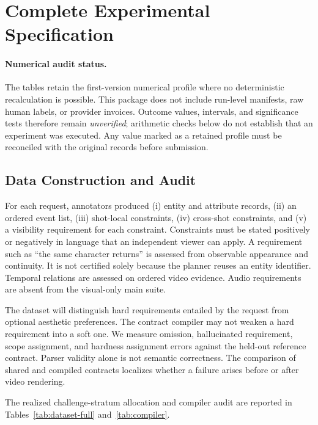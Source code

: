\section{Complete Experimental Specification}
\label{app:experimental-spec}

\paragraph{Numerical audit status.}
The tables retain the first-version numerical profile where no deterministic
recalculation is possible. This package does not include run-level manifests,
raw human labels, or provider invoices. Outcome values, intervals, and
significance tests therefore remain \emph{unverified}; arithmetic checks below
do not establish that an experiment was executed. Any value marked as a
retained profile must be reconciled with the original records before submission.

\subsection{Data Construction and Audit}
For each request, annotators produced (i) entity and attribute records,
(ii) an ordered event list, (iii) shot-local constraints, (iv) cross-shot
constraints, and (v) a visibility requirement for each constraint. Constraints
must be stated positively or negatively in language that an independent viewer
can apply. A requirement such as ``the same character returns'' is assessed from
observable appearance and continuity. It is not certified solely because the
planner reuses an entity identifier. Temporal relations are assessed on ordered
video evidence. Audio requirements are absent from the visual-only main suite.

The dataset will distinguish hard requirements entailed by the request from
optional aesthetic preferences. The contract compiler may not weaken a hard
requirement into a soft one. We measure omission, hallucinated requirement,
scope assignment, and hardness assignment errors against the held-out reference
contract. Parser validity alone is not semantic correctness. The comparison of
shared and compiled contracts localizes whether a failure arises before or after
video rendering.

The realized challenge-stratum allocation and compiler audit are reported in
Tables~\ref{tab:dataset-full} and~\ref{tab:compiler}.

